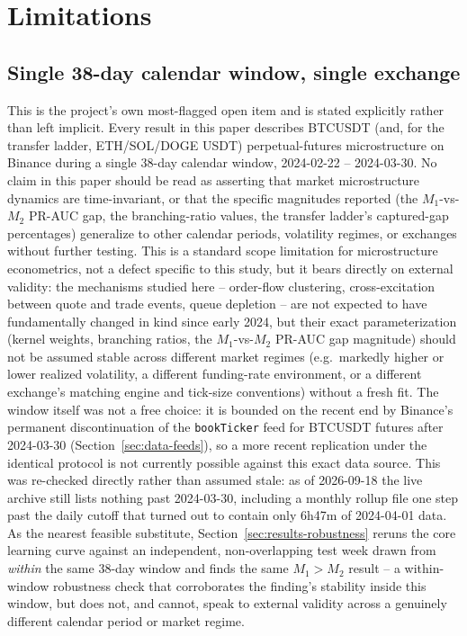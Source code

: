 \section{Limitations}
\label{sec:limitations}

\subsection{Single 38-day calendar window, single exchange}
\label{sec:limitations-window}

This is the project's own most-flagged open item and is stated
explicitly rather than left implicit. Every result in this paper
describes BTCUSDT (and, for the transfer ladder, ETH/SOL/DOGE USDT)
perpetual-futures microstructure on Binance during a single 38-day
calendar window, 2024-02-22 -- 2024-03-30. No claim in this paper should
be read as asserting that market microstructure dynamics are
time-invariant, or that the specific magnitudes reported (the
$M_1$-vs-$M_2$ PR-AUC gap, the branching-ratio values, the transfer
ladder's captured-gap percentages) generalize to other calendar periods,
volatility regimes, or exchanges without further testing. This is a
standard scope limitation for microstructure econometrics, not a defect
specific to this study, but it bears directly on external validity: the
mechanisms studied here -- order-flow clustering, cross-excitation
between quote and trade events, queue depletion -- are not expected to
have fundamentally changed in kind since early 2024, but their exact
parameterization (kernel weights, branching ratios, the $M_1$-vs-$M_2$
PR-AUC gap magnitude) should not be assumed stable across different
market regimes (e.g.\ markedly higher or lower realized volatility, a
different funding-rate environment, or a different exchange's matching
engine and tick-size conventions) without a fresh fit. The
window itself was not a free choice: it is bounded on the recent end by
Binance's permanent discontinuation of the \texttt{bookTicker} feed for
BTCUSDT futures after 2024-03-30 (Section~\ref{sec:data-feeds}), so a
more recent replication under the identical protocol is not currently
possible against this exact data source. This was re-checked directly
rather than assumed stale: as of 2026-09-18 the live archive still lists
nothing past 2024-03-30, including a monthly rollup file one step past
the daily cutoff that turned out to contain only 6h47m of 2024-04-01
data. As the nearest feasible substitute, Section~\ref{sec:results-robustness}
reruns the core learning curve against an independent, non-overlapping
test week drawn from \emph{within} the same 38-day window and finds the
same $M_1>M_2$ result -- a within-window robustness check that
corroborates the finding's stability inside this window, but does not,
and cannot, speak to external validity across a genuinely different
calendar period or market regime.

